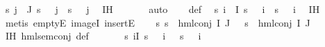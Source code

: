 \begin{isabellebody}
\ {\isachardoublequoteopen}{\isacharparenleft}{\kern0pt}{\isasymforall}s{\isachardot}{\kern0pt}\ {\isasymforall}j\ {\isasymin}\ J{\isachardot}{\kern0pt}\ {\isacharparenleft}{\kern0pt}{\isasymnot}{\isacharparenleft}{\kern0pt}s\ {\isasymTurnstile}\ {\isacharparenleft}{\kern0pt}{\isasymPsi}\ j{\isacharparenright}{\kern0pt}{\isacharparenright}{\kern0pt}\ {\isacharequal}{\kern0pt}\ {\isacharparenleft}{\kern0pt}{\isasymnot}{\isacharparenleft}{\kern0pt}s\ {\isasymTurnstile}\ {\isacharparenleft}{\kern0pt}{\isasymPhi}\ j{\isacharparenright}{\kern0pt}{\isacharparenright}{\kern0pt}{\isacharparenright}{\kern0pt}{\isacharparenright}{\kern0pt}{\isacharparenright}{\kern0pt}{\isachardoublequoteclose}\ \isamarkupfalse%
\ IH\ \isanewline
\ \ \ \ \isamarkupfalse%
\ auto\isanewline
\ \ \isamarkupfalse%
\ {\isasymPsi}{\isacharunderscore}{\kern0pt}def\ \isamarkupfalse%
\ {\isachardoublequoteopen}{\isacharparenleft}{\kern0pt}{\isasymforall}s{\isachardot}{\kern0pt}\ {\isasymforall}i\ {\isasymin}\ I{\isachardot}{\kern0pt}\ {\isacharparenleft}{\kern0pt}{\isasymnot}{\isacharparenleft}{\kern0pt}s\ {\isasymTurnstile}\ {\isacharparenleft}{\kern0pt}{\isasymPsi}\ i{\isacharparenright}{\kern0pt}{\isacharparenright}{\kern0pt}\ {\isacharequal}{\kern0pt}\ {\isacharparenleft}{\kern0pt}{\isasymnot}{\isacharparenleft}{\kern0pt}s\ {\isasymTurnstile}\ {\isacharparenleft}{\kern0pt}{\isasymPhi}\ i{\isacharparenright}{\kern0pt}{\isacharparenright}{\kern0pt}{\isacharparenright}{\kern0pt}{\isacharparenright}{\kern0pt}{\isacharparenright}{\kern0pt}{\isachardoublequoteclose}\ \isamarkupfalse%
\ IH\ \isanewline
\ \ \ \ \isamarkupfalse%
\ {\isacharparenleft}{\kern0pt}metis\ emptyE\ imageI\ insertE{\isacharparenright}{\kern0pt}\isanewline
\ \ \isamarkupfalse%
\ {\isachardoublequoteopen}{\isacharparenleft}{\kern0pt}{\isasymforall}s{\isachardot}{\kern0pt}\ {\isacharparenleft}{\kern0pt}s\ {\isasymTurnstile}\ hml{\isacharunderscore}{\kern0pt}conj\ I\ J\ {\isasymPhi}{\isacharparenright}{\kern0pt}\ {\isacharequal}{\kern0pt}\ {\isacharparenleft}{\kern0pt}s\ {\isasymTurnstile}\ {\isacharparenleft}{\kern0pt}hml{\isacharunderscore}{\kern0pt}conj\ I\ J\ {\isasymPsi}{\isacharparenright}{\kern0pt}{\isacharparenright}{\kern0pt}{\isacharparenright}{\kern0pt}{\isachardoublequoteclose}\ \isamarkupfalse%
\ IH\ hml{\isacharunderscore}{\kern0pt}sem{\isacharunderscore}{\kern0pt}conj\ {\isasymPsi}{\isacharunderscore}{\kern0pt}def\ \isanewline
\ \ \ \ \isamarkupfalse%
\ {\isacartoucheopen}{\isasymforall}s{\isachardot}{\kern0pt}\ {\isasymforall}i{\isasymin}I{\isachardot}{\kern0pt}\ {\isacharparenleft}{\kern0pt}s\ {\isasymTurnstile}\ {\isasymPsi}\ i{\isacharparenright}{\kern0pt}\ {\isasymnoteq}\ {\isacharparenleft}{\kern0pt}{\isasymnot}\ s\ {\isasymTurnstile}\ {\isasymPhi}\ i{\isacharparenright}{\kern0pt}{\isacartoucheclose}\ \isamarkupfalse%

\end{isabellebody}
